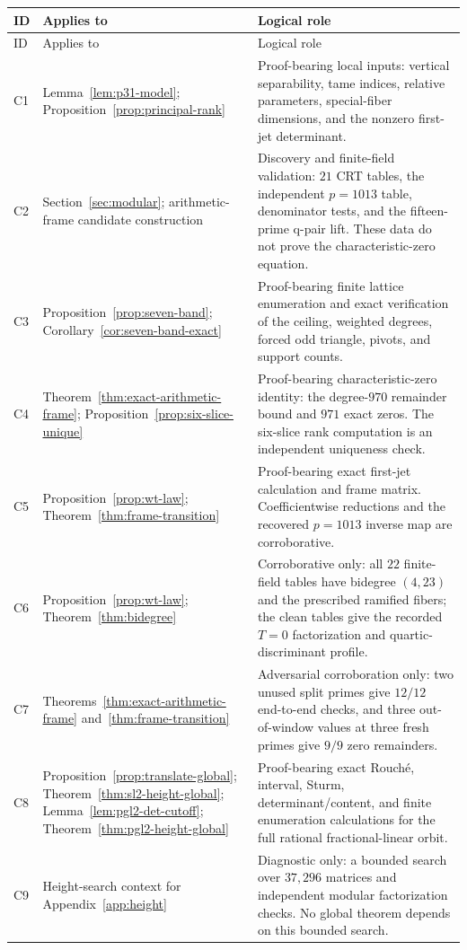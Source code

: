 \documentclass[11pt]{article}
\begin{document}
\begingroup
\small
\setlength{\tabcolsep}{4pt}
\renewcommand{\arraystretch}{1.14}
\begin{longtable}{@{}>{\raggedright\arraybackslash}p{}>{\raggedright\arraybackslash}p{}>{\raggedright\arraybackslash}p{}@{}}
\toprule
ID & Applies to & Logical role \\
\midrule
\endfirsthead
\toprule
ID & Applies to & Logical role \\
\midrule
\endhead
C1 & Lemma~\ref{lem:p31-model}; Proposition~\ref{prop:principal-rank} & Proof-bearing local inputs: vertical separability, tame indices, relative parameters, special-fiber dimensions, and the nonzero first-jet determinant. \\
C2 & Section~\ref{sec:modular}; arithmetic-frame candidate construction & Discovery and finite-field validation: $21$ CRT tables, the independent $p=1013$ table, denominator tests, and the fifteen-prime q-pair lift.  These data do not prove the characteristic-zero equation. \\
C3 & Proposition~\ref{prop:seven-band}; Corollary~\ref{cor:seven-band-exact} & Proof-bearing finite lattice enumeration and exact verification of the ceiling, weighted degrees, forced odd triangle, pivots, and support counts. \\
C4 & Theorem~\ref{thm:exact-arithmetic-frame}; Proposition~\ref{prop:six-slice-unique} & Proof-bearing characteristic-zero identity: the degree-$970$ remainder bound and $971$ exact zeros.  The six-slice rank computation is an independent uniqueness check. \\
C5 & Proposition~\ref{prop:wt-law}; Theorem~\ref{thm:frame-transition} & Proof-bearing exact first-jet calculation and frame matrix.  Coefficientwise reductions and the recovered $p=1013$ inverse map are corroborative. \\
C6 & Proposition~\ref{prop:wt-law}; Theorem~\ref{thm:bidegree} & Corroborative only: all $22$ finite-field tables have bidegree $(4,23)$ and the prescribed ramified fibers; the clean tables give the recorded $T=0$ factorization and quartic-discriminant profile. \\
C7 & Theorems~\ref{thm:exact-arithmetic-frame} and~\ref{thm:frame-transition} & Adversarial corroboration only: two unused split primes give $12/12$ end-to-end checks, and three out-of-window values at three fresh primes give $9/9$ zero remainders. \\
C8 & Proposition~\ref{prop:translate-global}; Theorem~\ref{thm:sl2-height-global}; Lemma~\ref{lem:pgl2-det-cutoff}; Theorem~\ref{thm:pgl2-height-global} & Proof-bearing exact Rouch\'e, interval, Sturm, determinant/content, and finite enumeration calculations for the full rational fractional-linear orbit. \\
C9 & Height-search context for Appendix~\ref{app:height} & Diagnostic only: a bounded search over $37{,}296$ matrices and independent modular factorization checks.  No global theorem depends on this bounded search. \\
\bottomrule
\end{longtable}
\endgroup
\end{document}
